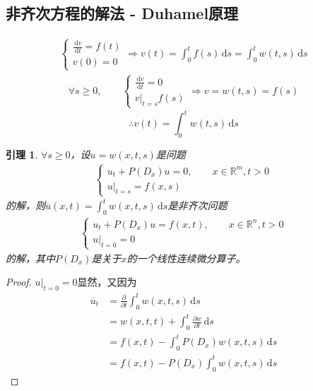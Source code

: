 \documentclass[11pt, a4paper]{article}
\theoremstyle{theorem}
\newtheorem{lemma}[thm]{引理}
\newcommand{\intd}[1]{\,\mathrm{d}{#1}}
\begin{document}
\subsection{非齐次方程的解法 - Duhamel原理}
\begin{align}
  \begin{cases}
  \frac{\intd v}{\intd t} = f(t) \\
  v(0) = 0
  \end{cases} \Longrightarrow
  v(t) = \int_0^t f(s) \intd s = \int_0^t w(t,s) \intd s
\end{align}
\begin{align*}
\forall s \geq 0, \quad \quad \begin{cases}
\frac{\intd v}{\intd t} = 0 \\
v|_{t=s} f(s)
\end{cases} \Longrightarrow
v = w(t,s) = f(s)
\end{align*}
$$
\therefore v(t) = \int_0^t w(t,s) \intd s
$$
\begin{lemma}
$\forall s \geq 0$，设$u = w(x,t,s)$是问题
\begin{align}
\begin{cases}
u_t + P(D_x) u = 0, \quad \quad x \in \mathbb{R}^m, t > 0 \\
u|_{t=s} = f(x,s)
\end{cases}
\end{align}
的解，则$\overline{u}(x,t) = \int_0^t w(x,t,s) \intd s$是非齐次问题
\begin{align}
    \begin{cases}
    u_t + P(D_x)u = f(x,t), \quad \quad x \in \mathbb{R}^n, t > 0 \\
    u|_{t = 0} = 0
    \end{cases}
\end{align}
的解，其中$P(D_x)$是关于$x$的一个线性连续微分算子。
\end{lemma}

\begin{proof}
$u|_{t = 0} = 0$显然，又因为
\begin{align*}
    \overline{u}_t &= \frac{\partial }{\partial t} \int_0^t w(x,t,s) \intd s \\
    &= w(x,t,t) + \int_0^t \frac{\partial w}{\partial t} \intd s \\
    &= f(x,t) - \int_0^t P(D_x) w(x,t,s) \intd s \\
    &= f(x,t) - P(D_x) \int_0^t w(x,t,s) \intd s
\end{align*}
\end{proof}
\end{document}

